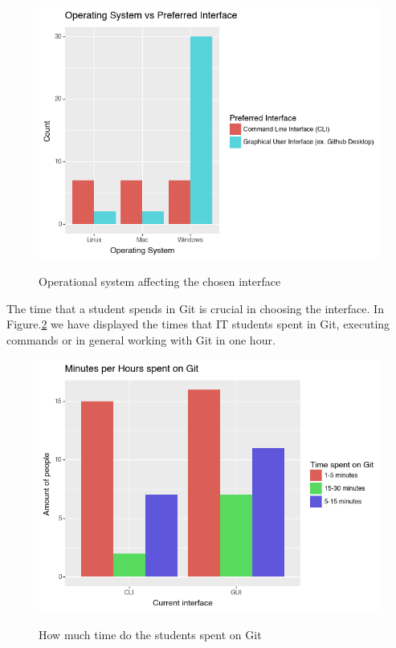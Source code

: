 \documentclass[]{report}
\begin{document}
		\begin{figure}[H]
			\centering
			\includegraphics[width=0.75\linewidth]{OSAffectsInterface}\\
			\caption{Operational system affecting the chosen interface}
			\label{fig: 6}
		\end{figure}
		
		The time that a student spends in Git is crucial in choosing the interface. In Figure.\ref{fig: 7} we have displayed the times that IT students spent in Git, executing commands or in general working with Git in one hour.
			\begin{figure}[H]
			\centering
			\includegraphics[width=0.75\linewidth]{TimeSpentGit}\\
			\caption{How much time do the students spent on Git}
			\label{fig: 7}
		\end{figure}
		
\end{document}
